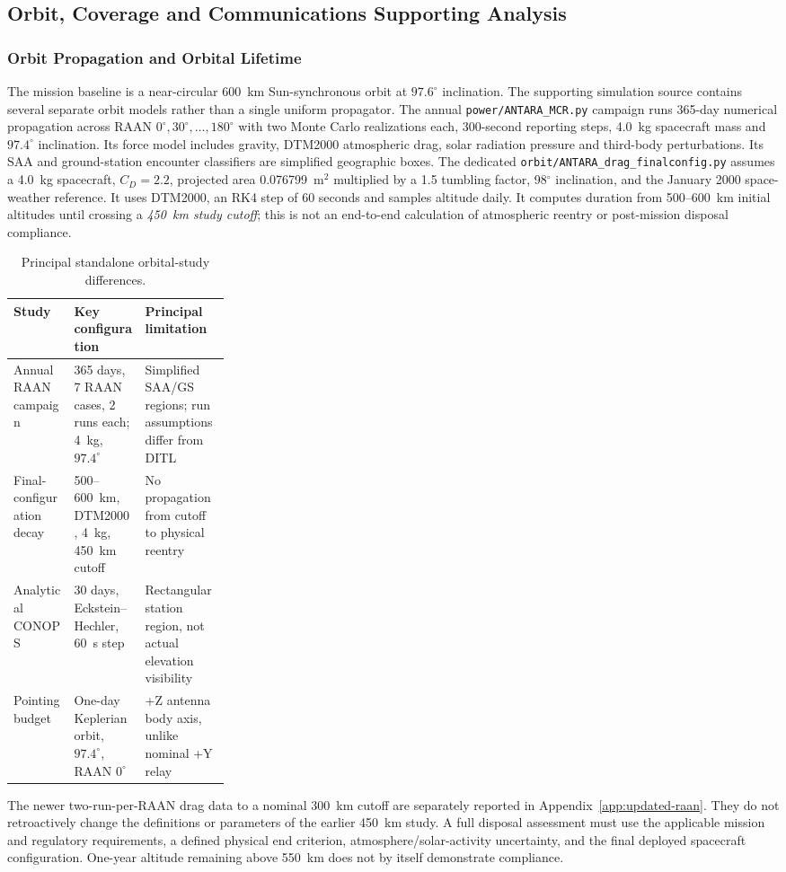 
\subsection{Orbit, Coverage and Communications Supporting Analysis}\label{app:orbit-rf}
\subsubsection{Orbit Propagation and Orbital Lifetime}\label{app:orbit-support}
The mission baseline is a near-circular 600~km Sun-synchronous orbit at $97.6^\circ$ inclination. The supporting simulation source contains several separate orbit models rather than a single uniform propagator. The annual \texttt{power/ANTARA\_MCR.py} campaign runs 365-day numerical propagation across RAAN $0^\circ,30^\circ,\ldots,180^\circ$ with two Monte Carlo realizations each, 300-second reporting steps, 4.0~kg spacecraft mass and $97.4^\circ$ inclination. Its force model includes gravity, DTM2000 atmospheric drag, solar radiation pressure and third-body perturbations. Its SAA and ground-station encounter classifiers are simplified geographic boxes.
The dedicated \texttt{orbit/ANTARA\_drag\_finalconfig.py} assumes a 4.0~kg spacecraft, $C_D=2.2$, projected area 0.076799~m$^2$ multiplied by a 1.5 tumbling factor, 98$^\circ$ inclination, and the January 2000 space-weather reference. It uses DTM2000, an RK4 step of 60 seconds and samples altitude daily. It computes duration from 500--600~km initial altitudes until crossing a \emph{450~km study cutoff}; this is not an end-to-end calculation of atmospheric reentry or post-mission disposal compliance.
\begin{table}[htbp]\centering\caption{Principal standalone orbital-study differences.}\label{tab:orbit-study-comparison}\begin{tabularx}{\linewidth}{p{0.28\linewidth}XX}\toprule Study & Key configuration & Principal limitation\\\midrule
Annual RAAN campaign & 365 days, 7 RAAN cases, 2 runs each; 4~kg, $97.4^\circ$ & Simplified SAA/GS regions; run assumptions differ from DITL\\
Final-configuration decay & 500--600~km, DTM2000, 4~kg, 450~km cutoff & No propagation from cutoff to physical reentry\\
Analytical CONOPS & 30 days, Eckstein--Hechler, 60~s step & Rectangular station region, not actual elevation visibility\\
Pointing budget & One-day Keplerian orbit, $97.4^\circ$, RAAN $0^\circ$ & +Z antenna body axis, unlike nominal +Y relay\\\bottomrule\end{tabularx}\end{table}
The newer two-run-per-RAAN drag data to a nominal 300~km cutoff are separately reported in Appendix~\ref{app:updated-raan}. They do not retroactively change the definitions or parameters of the earlier 450~km study.
A full disposal assessment must use the applicable mission and regulatory requirements, a defined physical end criterion, atmosphere/solar-activity uncertainty, and the final deployed spacecraft configuration. One-year altitude remaining above 550~km does not by itself demonstrate compliance.

